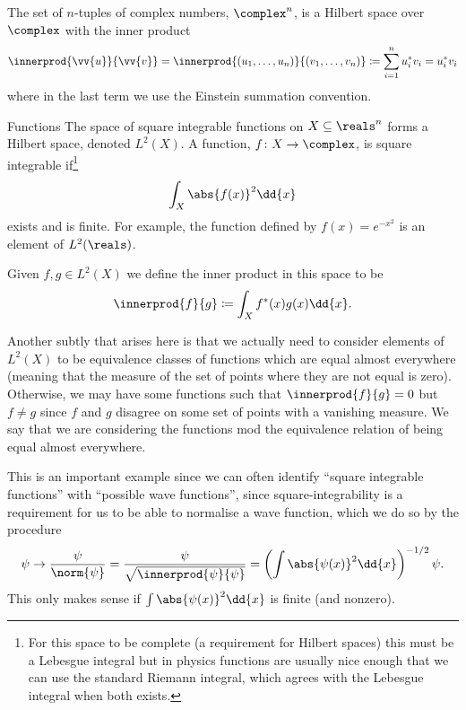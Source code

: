 \begin{exm}{}{}
    The set of \(n\)-tuples of complex numbers, \(\complex^n\), is a Hilbert space over \(\complex\) with the inner product
    \begin{equation}
        \innerprod{\vv{u}}{\vv{v}} = \innerprod{(u_1, \dotsc, u_n)}{(v_1, \dotsc, v_n)} \coloneqq \sum_{i=1}^n u_i^*v_i = u_i^*v_i
    \end{equation}
    where in the last term we use the Einstein summation convention.
\end{exm}

\begin{exm}{Functions}{}
    The space of square integrable functions on \(X \subseteq \reals^n\) forms a Hilbert space, denoted \(L^2(X)\).
    A function, \(f\colon X \to \complex\), is square integrable if\footnote{For this space to be complete (a requirement for Hilbert spaces) this must be a Lebesgue integral but in physics functions are usually nice enough that we can use the standard Riemann integral, which agrees with the Lebesgue integral when both exists.}
    \begin{equation}
        \int_{X} \abs{f(x)}^2 \dd{x}
    \end{equation}
    exists and is finite.
    For example, the function defined by \(f(x) = e^{-x^2}\) is an element of \(L^2(\reals)\).
    
    Given \(f, g \in L^2(X)\) we define the inner product in this space to be
    \begin{equation}
        \innerprod{f}{g} \coloneqq \int_{X} f^*(x)g(x) \dd{x}.
    \end{equation}
    \begin{rmk}
        Another subtly that arises here is that we actually need to consider elements of \(L^2(X)\) to be equivalence classes of functions which are equal almost everywhere (meaning that the measure of the set of points where they are not equal is zero).
        Otherwise, we may have some functions such that \(\innerprod{f}{g} = 0\) but \(f \ne g\) since \(f\) and \(g\) disagree on some set of points with a vanishing measure.
        We say that we are considering the functions mod the equivalence relation of being equal almost everywhere.
    \end{rmk}
    
    This is an important example since we can often identify \enquote{square integrable functions} with \enquote{possible wave functions}, since square-integrability is a requirement for us to be able to normalise a wave function, which we do so by the procedure
    \begin{equation}
        \psi \to \frac{\psi}{\norm{\psi}} = \frac{\psi}{\sqrt{\innerprod{\psi}{\psi}}} = \left( \int \abs{\psi(x)}^2 \dd{x} \right)^{-1/2} \psi.
    \end{equation}
    This only makes sense if \(\int \abs{\psi(x)}^2 \dd{x}\) is finite (and nonzero).
\end{exm}

